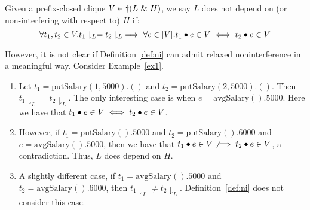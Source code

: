 \documentclass[acmsmall,screen,review, nonacm]{acmart}
\begin{document}
\begin{definition}\label{def:ni}
  Given a prefix-closed clique $V \in \dagger(L ~\&~ H)$, we say $L$ does not depend on (or non-interfering with respect to) $H$ if:
  \[
  \forall t_1, t_2 \in V. t_1\downharpoonright_L = t_2\downharpoonright_L \implies \forall e \in |V|. t_1 \bullet e \in V \iff t_2 \bullet e \in V
  \]
\end{definition}


However, it is not clear if Definition \ref{def:ni} can  admit  relaxed noninterference in a meaningful way.
Consider Example~\ref{ex1}.

\begin{enumerate}

\item Let $t_1 = \text{putSalary}(1, 5000).()$ and  $t_2 = \text{putSalary}(2, 5000).()$.
Then $t_1\downharpoonright_L = t_2\downharpoonright_L$. The only interesting case is when $e = \text{avgSalary}().5000$.
Here we have that $t_1 \bullet e \in V \iff t_2 \bullet e \in V$.

\item
However,  if $t_1 = \text{putSalary}().5000$ and  $t_2 = \text{putSalary}().6000$ and $e = \text{avgSalary}().5000$, then we have that $t_1 \bullet e \in V \not \implies t_2 \bullet e \in V$, a contradiction.
Thus, $L$ does depend on $H$.

\item
A slightly different case,  if $t_1 = \text{avgSalary}().5000$ and  $t_2 = \text{avgSalary}().6000$, then $t_1\downharpoonright_L \ne t_2\downharpoonright_L$. Definition~\ref{def:ni} does not consider this case.

\end{enumerate}






\end{document}
